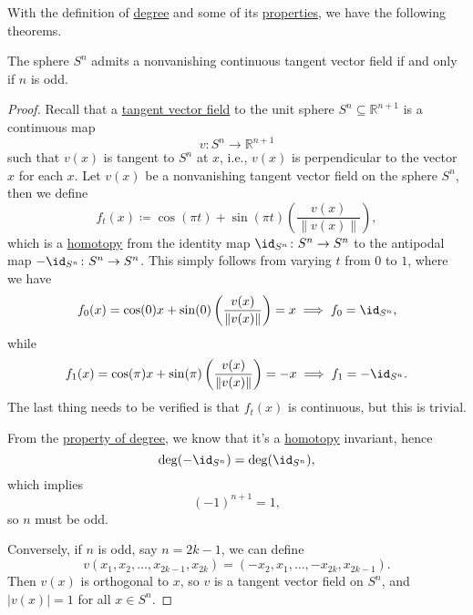 With the definition of \hyperref[def:degree]{degree} and some of its \hyperref[rmk:property-of-degree]{properties}, we have the following theorems.
\begin{theorem}\label{thm:hairy-ball-theorem}
	The sphere \(S^n\) admits a nonvanishing continuous tangent vector field if and only if \(n\) is odd.
\end{theorem}
\begin{proof}
	Recall that a \underline{tangent vector field} to the unit sphere \(S^n\subseteq \mathbb{R} ^{n+1}\) is a continuous map
	\[
		v \colon S^n \to \mathbb{R} ^{n+1}
	\]
	such that \(v(x)\) is tangent to \(S^n\) at \(x\), i.e., \(v(x)\) is perpendicular to the vector \(x\) for each \(x\). Let \(v(x)\) be a
	nonvanishing tangent vector field on the sphere \(S^n\), then we define
	\[
		f_t(x) \coloneqq \cos (\pi t) + \sin (\pi t)\left(\frac{v(x)}{\left\lVert v(x)\right\rVert }\right),
	\]
	which is a \hyperref[def:homotopy]{homotopy} from the identity map \(\id_{S^n}\colon S^n \to S^n \) to the antipodal map
	\(-\id_{S^n}\colon S^{n}\to S^n\). This simply follows from varying \(t\) from \(0\) to \(1\), where we have
	\[
		f_0(x) = \cos (0) x + \sin (0) \left(\frac{v(x)}{\left\lVert v(x)\right\rVert }\right) = x \implies f_0 = \id_{S^n} ,
	\]
	while
	\[
		f_1(x) = \cos (\pi )x + \sin (\pi )\left(\frac{v(x)}{\left\lVert v(x)\right\rVert }\right) = - x \implies f_{1} = - \id_{S^n}.
	\]
	The last thing needs to be verified is that \(f_t(x)\) is continuous, but this is trivial.


	From the \hyperref[rmk:property-of-degree]{property of degree}, we know that it's a \hyperref[def:homotopy]{homotopy} invariant, hence
	\[
		\deg (-\id_{S^n}) = \deg (\id_{S^n} ),
	\]
	which implies
	\[
		(-1)^{n+1} = 1,
	\]
	so \(n\) must be odd.

	Conversely, if \(n\) is odd, say \(n=2k-1\), we can define
	\[
		v(x_1, x_2, \dots , x_{2k-1}, x_{2k})= (-x_2, x_1, \dots , -x_{2k}, x_{2k-1}).
	\]
	Then \(v(x)\) is orthogonal to \(x\), so \(v\) is a tangent vector field on \(S^n\), and \(\left\vert v(x) \right\vert = 1\) for all \(x\in S^n\).
\end{proof}

